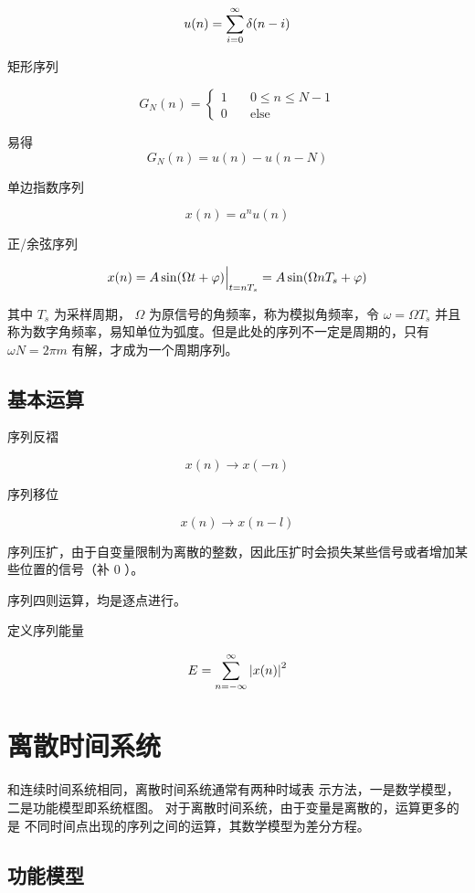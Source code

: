 \documentclass[cn,11pt,chinese,black,simple]{../elegantbook}
\begin{document}
\[u(n) = \displaystyle\sum_{i=0}^\infty \delta(n - i)\]

矩形序列

\[G_N(n) = \left\{
    \begin{aligned}
        1\quad & 0 \leq n \leq N-1 \\
        0\quad & \text{else}
    \end{aligned}
    \right.    
\]

易得 \[G_N(n) = u(n) - u(n - N)\]

单边指数序列 

\[x(n) = a^n u(n)\]

正/余弦序列

\[x(n) = A \sin(\Omega t + \varphi)\Big|_{t = n T_s} = A \sin(\Omega n T_s + \varphi)\]

其中 \(T_s\) 为采样周期， \(\Omega\) 为原信号的角频率，称为模拟角频率，令 \(\omega = \Omega T_s\) 并且称为数字角频率，易知单位为弧度。但是此处的序列不一定是周期的，只有 \(\omega N = 2 \pi m\) 有解，才成为一个周期序列。

    
\subsection{基本运算}

序列反褶 

\[x(n) \rightarrow x(-n)\]

序列移位 

\[x(n) \rightarrow x(n - l)\]

序列压扩，由于自变量限制为离散的整数，因此压扩时会损失某些信号或者增加某些位置的信号（补 \(0\) ）。

序列四则运算，均是逐点进行。

定义序列能量

\[E = \displaystyle\sum_{n=-\infty}^{\infty} \left| x(n) \right|^2\]



\section{离散时间系统}

和连续时间系统相同，离散时间系统通常有两种时域表
示方法，一是数学模型，二是功能模型即系统框图。
对于离散时间系统，由于变量是离散的，运算更多的是
不同时间点出现的序列之间的运算，其数学模型为差分方程。

\subsection{功能模型}
\end{document}
